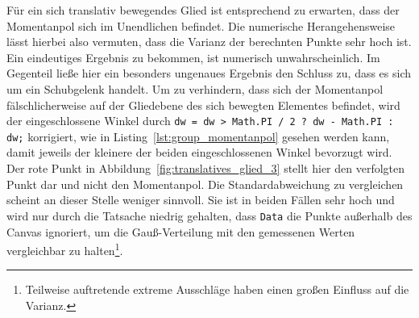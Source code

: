 Für ein sich translativ bewegendes Glied ist entsprechend zu erwarten, dass der Momentanpol sich im Unendlichen befindet.
Die numerische Herangehensweise lässt hierbei also vermuten, dass die Varianz der berechnten Punkte sehr hoch ist.
Ein eindeutiges Ergebnis zu bekommen, ist numerisch unwahrscheinlich.
Im Gegenteil lie{\ss}e hier ein besonders ungenaues Ergebnis den Schluss zu, dass es sich um ein Schubgelenk handelt.
Um zu verhindern, dass sich der Momentanpol fälschlicherweise auf der Gliedebene des sich bewegten Elementes befindet, wird der eingeschlossene Winkel durch \lstinline{dw = dw > Math.PI / 2 ? dw - Math.PI : dw;} korrigiert, wie in Listing~\ref{lst:group_momentanpol} gesehen werden kann, damit jeweils der kleinere der beiden eingeschlossenen Winkel bevorzugt wird.
Der rote Punkt in Abbildung~\ref{fig:translatives_glied_3} stellt hier den verfolgten Punkt dar und nicht den Momentanpol.
Die Standardabweichung zu vergleichen scheint an dieser Stelle weniger sinnvoll.
Sie ist in beiden Fällen sehr hoch und wird nur durch die Tatsache niedrig gehalten, dass \lstinline{Data} die Punkte au{\ss}erhalb des Canvas ignoriert, um die Gau{\ss}-Verteilung mit den gemessenen Werten vergleichbar zu halten\footnote{Teilweise auftretende extreme Ausschläge haben einen gro{\ss}en Einfluss auf die Varianz.}.

